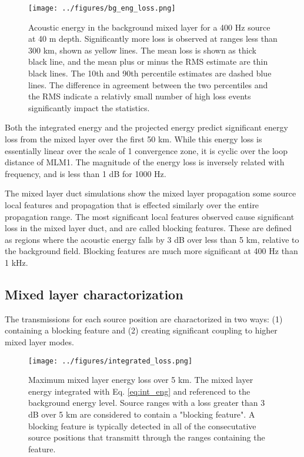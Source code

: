 \documentclass[preprint,NumberedRefs]{JASA}
\begin{document}
\begin{figure}
\texttt{[image: ../figures/bg\_eng\_loss.png]}
    \caption{Acoustic energy in the background mixed layer for a 400 Hz source at 40 m depth. Significantly more loss is observed at ranges less than 300 km, shown as yellow lines. The mean loss is shown as thick black line, and the mean plus or minus the RMS estimate are thin black lines. The 10th and 90th percentile estimates are dashed blue lines. The difference in agreement between the two percentiles and the RMS indicate a relativly small number of high loss events significantly impact the statistics.}
    \label{fig:bg_eng}
\end{figure}
Both the integrated energy and the projected energy predict significant energy loss from the mixed layer over the first 50 km. While this energy loss is essentially linear over the scale of 1 convergence zone, it is cyclic over the loop distance of MLM1. The magnitude of the energy loss is inversely related with frequency, and is less than 1 dB for 1000 Hz.

The mixed layer duct simulations show the mixed layer propagation some source local features and propagation that is effected similarly over the entire propagation range. The most significant local features observed cause significant loss in the mixed layer duct, and are called blocking features. These are defined as regions where the acoustic energy falls by 3 dB over less than 5 km, relative to the background field. Blocking features are much more significant at 400 Hz than 1 kHz.


\subsection{Mixed layer charactorization}
The transmissions for each source position are charactorized in two ways: (1) containing a blocking feature and (2) creating significant coupling to higher mixed layer modes.
\begin{figure}
\texttt{[image: ../figures/integrated\_loss.png]}
    \caption{Maximum mixed layer energy loss over 5 km. The mixed layer energy integrated with Eq. \eqref{eq:int_eng} and referenced to the background energy level. Source ranges with a loss greater than 3 dB over 5 km are considered to contain a "blocking feature". A blocking feature is typically detected in all of the consecutative source positions that transmitt through the ranges containing the feature.}
    \label{fig:shal_400_b}
\end{figure}
\end{document}
